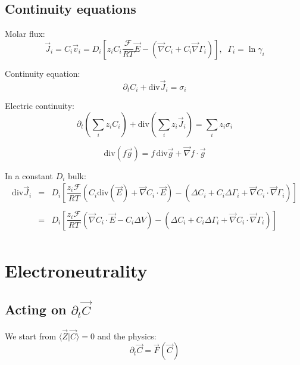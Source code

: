 \documentclass[aps,12pt]{revtex4}
\begin{document}
\subsection{Continuity equations}

Molar flux:
\begin{equation}
	\vec{J}_i = C_i \vec{v}_i = D_i \left[z_i C_i  \dfrac{\mathcal{F}}{RT} \vec{E} - \left(\vec{\nabla} C_i + C_i \vec{\nabla}\Gamma_i\right) \right],\;\;\Gamma_i = \ln \gamma_i
\end{equation}

Continuity equation:
\begin{equation}
	\partial_t C_i + \mathrm{div} \vec{J}_i = \sigma_i
\end{equation}

Electric continuity:
\begin{equation}
	\partial_t \left(\sum_i z_i C_i\right) + \mathrm{div} \left(\sum_i z_i \vec{J}_i\right) = \sum_i z_i \sigma_i
\end{equation}


\begin{equation}
	\mathrm{div}(f\vec{g}) = f \, \mathrm{div}\vec{g} + \vec{\nabla} f \cdot \vec{g}
\end{equation}

In a constant $D_i$ bulk:
\begin{equation}
\begin{array}{rcl}
\mathrm{div} \vec{J}_i & = & D_i \left[ \dfrac{z_i\mathcal{F}}{RT} 
\left(C_i \mathrm{div}\left(\vec{E}\right) + \vec{\nabla} C_i \cdot \vec{E} \right) 
- \left( \Delta C_i + C_i \Delta \Gamma_i + \vec{\nabla} C_i \cdot \vec{\nabla} \Gamma_i \right)
\right]\\
\\
 & = &  D_i \left[ \dfrac{z_i\mathcal{F}}{RT} 
\left(  \vec{\nabla} C_i \cdot \vec{E} - C_i \Delta V \right) 
- \left( \Delta C_i + C_i \Delta \Gamma_i + \vec{\nabla} C_i \cdot \vec{\nabla} \Gamma_i \right)
\right]\\
\end{array}
\end{equation}

\section{Electroneutrality}

\subsection{Acting on $\partial_t \vec C$}
We start from $\langle \vec Z \vert \vec C \rangle = 0$ and the physics:
\begin{equation}
	\partial_t \vec C = \vec F \left(\vec C \right)
\end{equation}
\end{document}
